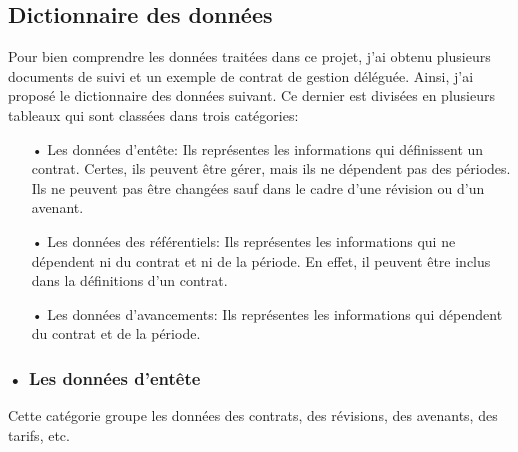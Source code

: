 \documentclass[a4paper]{report}
\begin{document}
\begin{doublespace}
	\subsection{Dictionnaire des données}
	Pour bien comprendre les données traitées dans ce projet, j'ai obtenu plusieurs documents de suivi et un exemple de contrat de gestion déléguée. Ainsi, j'ai proposé le dictionnaire des données suivant. Ce dernier est divisées en plusieurs tableaux qui sont classées dans trois catégories:
	\begin{itemize}
		\item[•] Les données d'entête: Ils représentes les informations qui définissent un contrat. Certes, ils peuvent être gérer, mais ils ne dépendent pas des périodes. Ils ne peuvent pas être changées sauf dans le cadre d'une révision ou d'un avenant.
		\item[•] Les données des référentiels: Ils représentes les informations qui ne dépendent ni du contrat et ni de la période. En effet, il peuvent être inclus dans la définitions d'un contrat.
		\item[•] Les données d'avancements: Ils représentes les informations qui dépendent du contrat et de la période.
	\end{itemize}

	\subsubsection{• Les données d'entête}

	Cette catégorie groupe les données des contrats, des révisions, des avenants, des tarifs, etc.


\end{doublespace}
\end{document}
